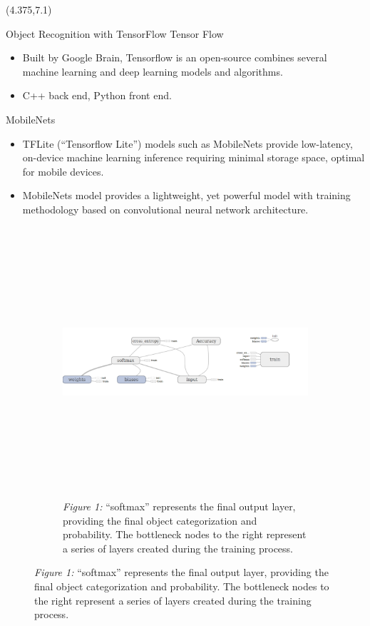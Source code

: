 \documentclass[22pt]{beamer}
\begin{document}
\begin{frame}[fragile]
\begin{textblock}{7.25}(4.375,7.1)
\begin{block}{Object Recognition with TensorFlow}
Tensor Flow
\begin{itemize}
\item Built by Google Brain, Tensorflow is an open-source combines several machine learning and deep learning models and algorithms.
\item C++ back end, Python front end.
\end{itemize}
MobileNets
\begin{itemize}
\item TFLite (“Tensorflow Lite”) models such as MobileNets provide low-latency, on-device machine learning inference requiring minimal storage space, optimal for mobile devices. 
\item MobileNets model provides a lightweight, yet powerful model with training methodology based on convolutional neural network architecture.
\end{itemize}
\begin{figure}[htbp] %
\begin{subfigure}{0.95\textwidth}
   \centering
   \includegraphics[height=10cm]{softmax.png}
   \caption*{\textit{Figure 1:} “softmax” represents the final output layer, providing the final object categorization and probability. The bottleneck nodes to the right represent a series of layers created during the training process.}
   \label{fig:softmax}
\end{subfigure}
\end{figure}

\end{block}
\end{textblock}
\end{frame}
\end{document}
